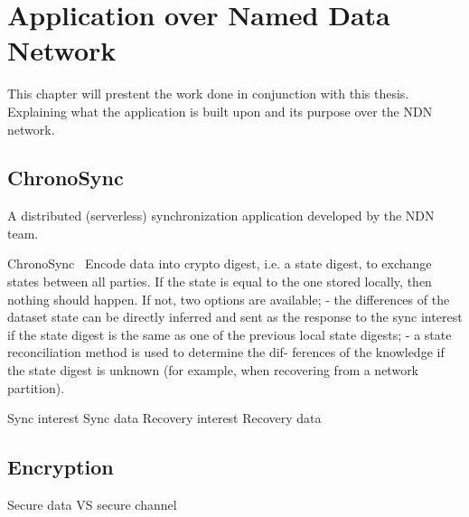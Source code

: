 \chapter{Application over Named Data Network}\label{chp3:application}
This chapter will prestent the work done in conjunction with this thesis. 
Explaining what the application is built upon and its purpose over the \gls{NDN} network. 

\section{ChronoSync}
A distributed (serverless) synchronization application developed by the \gls{NDN} team. 

ChronoSync~\cite{DBLP:conf/icnp/ZhuA13}
Encode data into crypto digest, i.e. a state digest, to exchange states between all parties. 
If the state is equal to the one stored locally, then nothing should happen.
If not, two options are available; 
- the differences of the dataset state can be directly inferred
and sent as the response to the sync interest if the state
digest is the same as one of the previous local state
digests;
- a state reconciliation method is used to determine the dif-
ferences of the knowledge if the state digest is unknown
(for example, when recovering from a network partition).

Sync interest
Sync data
Recovery interest
Recovery data


\section{Encryption}
Secure data VS secure channel